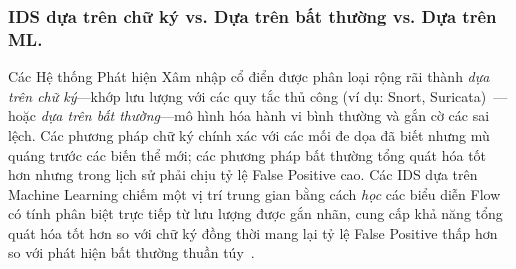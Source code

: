 \subsubsection*{IDS dựa trên chữ ký vs. Dựa trên bất thường vs. Dựa trên ML.}
Các Hệ thống Phát hiện Xâm nhập cổ điển được phân loại rộng rãi thành \emph{dựa trên chữ ký}---khớp lưu lượng với các quy tắc thủ công (ví dụ: Snort, Suricata)~\cite{ref_snort}---hoặc \emph{dựa trên bất thường}---mô hình hóa hành vi bình thường và gắn cờ các sai lệch. Các phương pháp chữ ký chính xác với các mối đe dọa đã biết nhưng mù quáng trước các biến thể mới; các phương pháp bất thường tổng quát hóa tốt hơn nhưng trong lịch sử phải chịu tỷ lệ False Positive cao. Các IDS dựa trên Machine Learning chiếm một vị trí trung gian bằng cách \emph{học} các biểu diễn Flow có tính phân biệt trực tiếp từ lưu lượng được gắn nhãn, cung cấp khả năng tổng quát hóa tốt hơn so với chữ ký đồng thời mang lại tỷ lệ False Positive thấp hơn so với phát hiện bất thường thuần túy~\cite{ref_anomaly_survey}.

